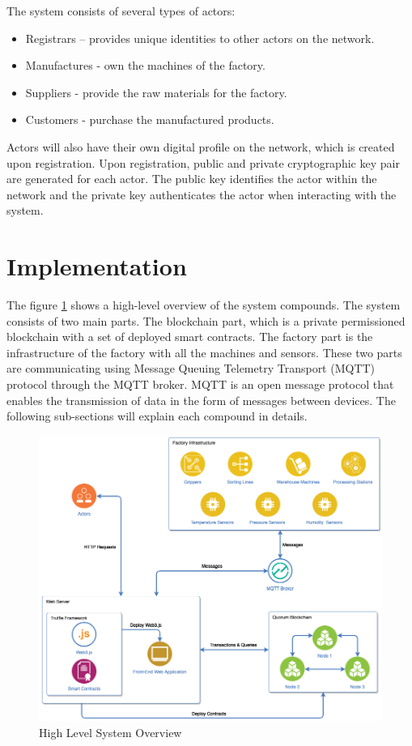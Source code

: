 \documentclass[runningheads]{llncs}
\begin{document}
\bigbreak

\noindent The system consists of several types of actors:
\begin{itemize}
  \item Registrars – provides unique identities to other actors on the network.
  \item Manufactures - own the machines of the factory.
  \item Suppliers - provide the raw materials for the factory.
  \item Customers - purchase the manufactured products.
\end{itemize}

\noindent Actors will also have their own digital profile on the network, which is created upon registration. Upon registration,  public and private cryptographic key pair are generated for each actor. The public key identifies the actor within the network and the private key authenticates the actor when interacting with the system.

\newpage
\section{Implementation}
The figure \ref{fig:system_overview} shows a high-level overview of the system compounds. The system consists of two main parts. The blockchain part, which is a private permissioned blockchain with a set of deployed smart contracts. The factory part is the infrastructure of the factory with all the machines and sensors. These two parts are communicating using Message Queuing Telemetry Transport (MQTT) protocol through the MQTT broker. MQTT is an open message protocol that enables the transmission of data in the form of messages between devices. The following sub-sections will explain each compound in details.

\begin{figure}
\centering
\includegraphics[width=1\textwidth]{figures/system_overview_2.png}
\caption{High Level System Overview}
\label{fig:system_overview}
\end{figure}
\end{document}
